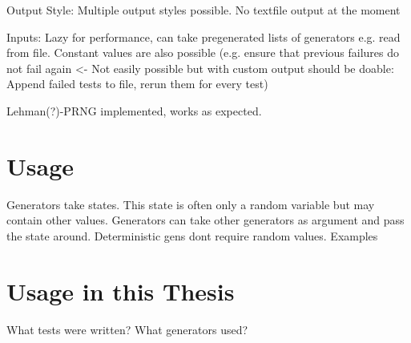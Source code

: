 Output Style: Multiple output styles possible. No textfile output at the moment

Inputs: Lazy for performance, can take pregenerated lists of generators e.g. read from file. Constant values are also possible (e.g. ensure that previous failures do not fail again <- Not easily possible but with custom output should be doable: Append failed tests to file, rerun them for every test)

Lehman(?)-PRNG implemented, works as expected.

\section{Usage}
Generators take states. This state is often only a random variable but may contain other values. Generators can take other generators as argument and pass the state around. Deterministic gens dont require random values.
Examples

\section{Usage in this Thesis}
What tests were written? What generators used?
